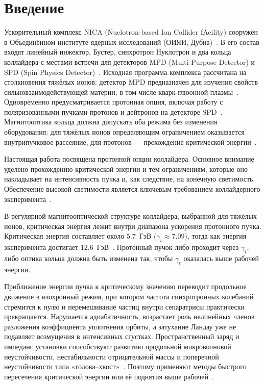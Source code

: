 \section*{Введение}
\label{sec:introduction}

Ускорительный комплекс NICA (Nuclotron-based Ion Collider fAcility) сооружён в Объединённом институте ядерных исследований (ОИЯИ, Дубна)~\cite{Butenko:2024_nica_status,Syresin:2021_polarized}. В его состав входят линейный инжектор, Бустер, синхротрон Нуклотрон и два кольца коллайдера с местами встречи для детекторов MPD (Multi-Purpose Detector) и SPD (Spin Physics Detector)~\cite{Syresin:2021_polarized,Ladygin:2022_spd}. Исходная программа комплекса рассчитана на столкновения тяжёлых ионов: детектор MPD предназначен для изучения свойств сильновзаимодействующей материи, в том числе кварк-глюонной плазмы~\cite{Kolokolchikov:2025_dual,Kolokolchikov:2026_thesis}. Одновременно предусматривается протонная опция, включая работу с поляризованными пучками протонов и дейтронов на детекторе SPD~\cite{Syresin:2021_polarized,Kolokolchikov:2026_thesis}. Магнитооптика кольца должна допускать оба режима без изменения оборудования: для тяжёлых ионов определяющим ограничением оказывается внутрипучковое рассеяние, для протонов --- прохождение критической энергии~\cite{Kolokolchikov:2021_high_gt,Kolokolchikov:2025_dual}.

Настоящая работа посвящена протонной опции коллайдера. Основное внимание уделено прохождению критической энергии и тем ограничениям, которые оно накладывает на интенсивность пучка и, как следствие, на конечную светимость. Обеспечение высокой светимости является ключевым требованием коллайдерного эксперимента~\cite{Kolokolchikov:2026_thesis}.

В регулярной магнитооптической структуре коллайдера, выбранной для тяжёлых ионов, критическая энергия лежит внутри диапазона ускорения протонного пучка. Критическая энергия составляет около $5.7$~ГэВ ($\gamma_t \approx 7.09$), тогда как энергия эксперимента достигает $12.6$~ГэВ~\cite{Syresin:2021_polarized,Kolokolchikov:2024_nica_rf,Kolokolchikov:2026_thesis}. Протонный пучок либо проходит через $\gamma_t$, либо оптика кольца должна быть изменена так, чтобы $\gamma_t$ оказалась выше рабочей энергии.

Приближение энергии пучка к критическому значению переводит продольное движение в изохронный режим, при котором частота синхротронных колебаний стремится к нулю и перемешивание частиц внутри сепаратрисы практически прекращается. Нарушается адиабатичность, возрастает роль нелинейных членов разложения коэффициента уплотнения орбиты, а затухание Ландау уже не подавляет возмущения в интенсивных сгустках. Пространственный заряд и импеданс установки способствуют развитию продольной микроволновой неустойчивости, нестабильности отрицательной массы и поперечной неустойчивости типа «голова--хвост»~\cite{Ng:2002_instabilities,Lee:2018_accel_phys,Metral:2011_transition}. Поэтому применяют методы быстрого пересечения критической энергии или её поднятия выше рабочей~\cite{Kolokolchikov:2026_thesis}.

